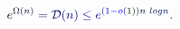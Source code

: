 \documentclass[12pt]{article}
\begin{document}
\makeatletter
\renewcommand*{\@textcolor}[3]{%
  \protect\leavevmode
  \begingroup
    \color#1{#2}#3%
  \endgroup
}
\makeatother
\begin{displaymath}
\mathcolor[RGB]{0,0,15}{e} ^ { \mathcolor[RGB]{0,0,30}{\Omega} \mathcolor[RGB]{0,0,45}{(} \mathcolor[RGB]{0,0,60}{n} \mathcolor[RGB]{0,0,75}{)} } \mathcolor[RGB]{0,0,90}{=} \mathcal { \mathcolor[RGB]{0,0,105}{D} } \mathcolor[RGB]{0,0,120}{(} \mathcolor[RGB]{0,0,135}{n} \mathcolor[RGB]{0,0,150}{)} \mathcolor[RGB]{0,0,165}{\leq} \mathcolor[RGB]{0,0,180}{e} ^ { \mathcolor[RGB]{0,0,195}{\left(} \mathcolor[RGB]{0,0,210}{1} \mathcolor[RGB]{0,0,225}{-} \mathcolor[RGB]{0,0,240}{o} \mathcolor[RGB]{0,0,255}{(} \mathcolor[RGB]{0,15,0}{1} \mathcolor[RGB]{0,15,15}{)} \mathcolor[RGB]{0,15,30}{\right)} \mathcolor[RGB]{0,15,45}{n} \mathcolor[RGB]{0,15,60}{\operatorname*} { \mathcolor[RGB]{0,15,75}{l} \mathcolor[RGB]{0,15,90}{o} \mathcolor[RGB]{0,15,105}{g} } \mathcolor[RGB]{0,15,120}{n} } \mathcolor[RGB]{0,15,135}{.}
\end{displaymath}
\end{document}
